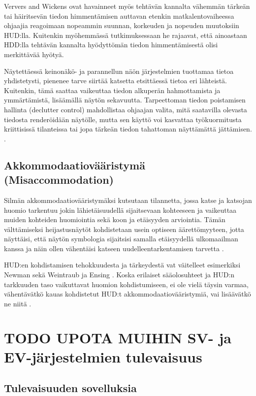 \documentclass[utf8,bachelor,manualbib]{gradu3}
\begin{document}
Ververs and Wickens \citeyearpar{ververswickens1996} ovat havainneet myös tehtävän kannalta vähemmän tärkeän tai häiritsevän tiedon himmentämisen auttavan etenkin matkalentovaiheessa ohjaajia reagoimaan nopeammin suunnan, korkeuden ja nopeuden muutoksiin HUD:lla. Kuitenkin myöhemmässä tutkimuksessaan \citeyearpar{ververswickens1998} he rajaavat, että ainoastaan HDD:lla tehtävän kannalta hyödyttömän tiedon himmentämisestä olisi merkittävää hyötyä.

Näytettäessä keinonäkö- ja parannellun näön järjestelmien tuottamaa tietoa yhdistetysti, pienenee tarve siirtää katsetta etsittäessä tietoa eri lähteistä. Kuitenkin, tämä saattaa vaikeuttaa tiedon alkuperän hahmottamista ja ymmärtämistä, lisäämällä näytön sekavuutta. Tarpeettoman tiedon poistamisen hallinta (declutter control) mahdollistaa ohjaajan valita, mitä saatavilla olevasta tiedosta renderöidään näytölle, mutta sen käyttö voi kasvattaa työkuormitusta kriittisissä tilanteissa tai jopa tärkeän tiedon tahattoman näyttämättä jättämisen. \citep{baileyym2007}.

\section{Akkommodaatiovääristymä (Misaccommodation)}

Silmän akkommodaatiovääristymäksi kutsutaan tilannetta, jossa katse ja katsojan huomio tarkentuu jokin lähietäisuudellä sijaitsevaan kohteeseen ja vaikeuttaa muiden kohteiden huomiointia sekä koon ja etäisyyden arviointia. Tämän välttämiseksi heijastusnäytöt kohdistetaan usein optiseen äärettömyyteen, jotta näyttäisi, että näytön symbologia sijaitsisi samalla etäisyydellä ulkomaailman kanssa ja näin ollen vähentäisi katseen uudelleentarkentamisen tarvetta \citep{naish1964}.

HUD:en kohdistamisen tehokkuudesta ja tärkeydestä vat väitelleet esimerkiksi Newman \citeyearpar{newman1995} sekä Weintraub ja Ensing \citeyearpar{weintraubensing1992}. Koska erilaiset sääolosuhteet ja HUD:n tarkkuuden taso vaikuttavat huomion kohdistumiseen, ei ole vielä täysin varmaa, vähentävätkö kauas kohdistetut HUD:t akkommodaatiovääristymiä, vai lisäävätkö ne niitä \citep{crawfordneal2006}.

\chapter{TODO UPOTA MUIHIN SV- ja EV-järjestelmien tulevaisuus}

\section{Tulevaisuuden sovelluksia}
\end{document}
